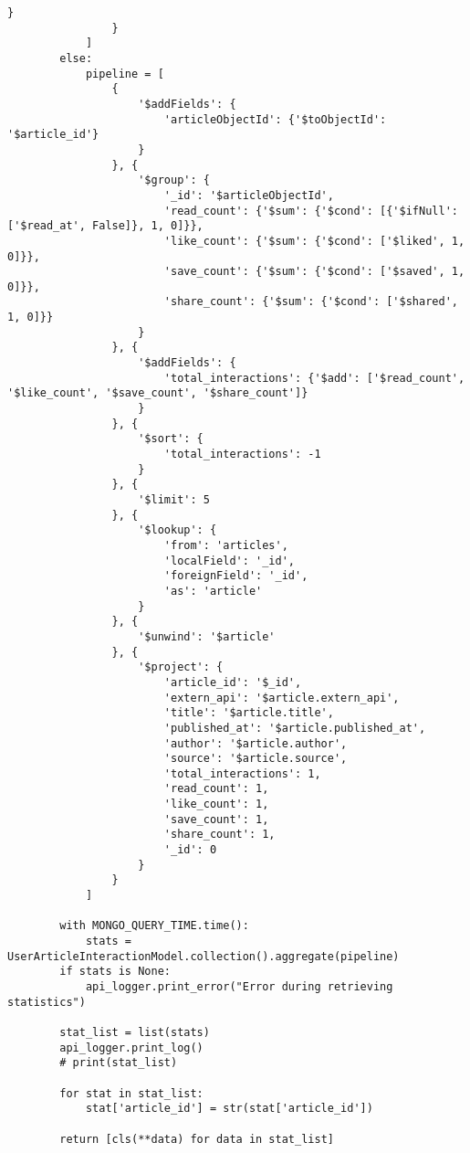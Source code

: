 \begin{lstlisting}[style=pythonstyle,label={lst:pipeline-most-interacted-articles},caption={Pipeline Most Interacted Articles}]
                    }
                }
            ]
        else:
            pipeline = [
                {
                    '$addFields': {
                        'articleObjectId': {'$toObjectId': '$article_id'}
                    }
                }, {
                    '$group': {
                        '_id': '$articleObjectId',
                        'read_count': {'$sum': {'$cond': [{'$ifNull': ['$read_at', False]}, 1, 0]}},
                        'like_count': {'$sum': {'$cond': ['$liked', 1, 0]}},
                        'save_count': {'$sum': {'$cond': ['$saved', 1, 0]}},
                        'share_count': {'$sum': {'$cond': ['$shared', 1, 0]}}
                    }
                }, {
                    '$addFields': {
                        'total_interactions': {'$add': ['$read_count', '$like_count', '$save_count', '$share_count']}
                    }
                }, {
                    '$sort': {
                        'total_interactions': -1
                    }
                }, {
                    '$limit': 5
                }, {
                    '$lookup': {
                        'from': 'articles',
                        'localField': '_id',
                        'foreignField': '_id',
                        'as': 'article'
                    }
                }, {
                    '$unwind': '$article'
                }, {
                    '$project': {
                        'article_id': '$_id',
                        'extern_api': '$article.extern_api',
                        'title': '$article.title',
                        'published_at': '$article.published_at',
                        'author': '$article.author',
                        'source': '$article.source',
                        'total_interactions': 1,
                        'read_count': 1,
                        'like_count': 1,
                        'save_count': 1,
                        'share_count': 1,
                        '_id': 0
                    }
                }
            ]

        with MONGO_QUERY_TIME.time():
            stats = UserArticleInteractionModel.collection().aggregate(pipeline)
        if stats is None:
            api_logger.print_error("Error during retrieving statistics")

        stat_list = list(stats)
        api_logger.print_log()
        # print(stat_list)

        for stat in stat_list:
            stat['article_id'] = str(stat['article_id'])

        return [cls(**data) for data in stat_list]
\end{lstlisting}


